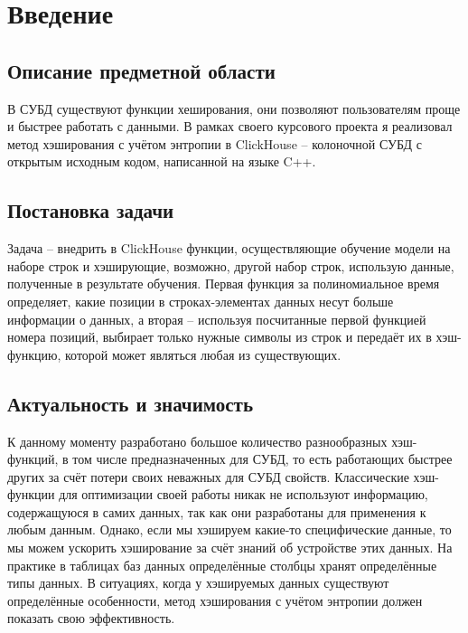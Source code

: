\documentclass[a4paper,12pt]{extarticle}
\begin{document}
\begin{sloppypar}

\section{Введение}
\subsection{Описание предметной области}

В СУБД существуют функции хеширования, они позволяют пользователям проще и быстрее работать с данными. В рамках своего курсового проекта я реализовал метод хэширования с учётом энтропии в ClickHouse -- колоночной СУБД с открытым исходным кодом, написанной на языке C++.

\subsection{Постановка задачи}

Задача -- внедрить в ClickHouse функции, осуществляющие обучение модели на наборе строк и хэширующие, возможно, другой набор строк, использую данные, полученные в результате обучения. Первая функция за полиномиальное время определяет, какие позиции в строках-элементах данных несут больше информации о данных, а вторая -- используя посчитанные первой функцией номера позиций, выбирает только нужные символы из строк и передаёт их в хэш-функцию, которой может являться любая из существующих.

\subsection{Актуальность и значимость}

К данному моменту разработано большое количество разнообразных хэш-функций, в том числе предназначенных для СУБД, то есть работающих быстрее других за счёт потери своих неважных для СУБД свойств. Классические хэш-функции для оптимизации своей работы никак не используют информацию, содержащуюся в самих данных, так как они разработаны для применения к любым данным. Однако, если мы хэшируем какие-то специфические данные, то мы можем ускорить хэширование за счёт знаний об устройстве этих данных. На практике в таблицах баз данных определённые столбцы хранят определённые типы данных. В ситуациях, когда у хэшируемых данных существуют определённые особенности, метод хэширования с учётом энтропии должен показать свою эффективность.


\end{sloppypar}
\end{document}
